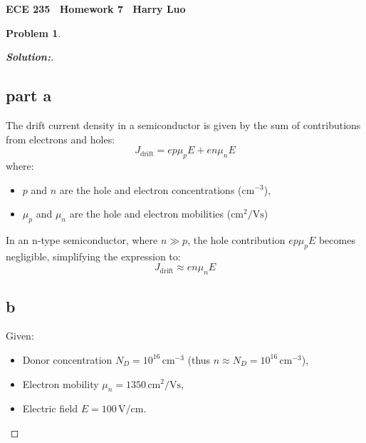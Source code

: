 \documentclass[12pt]{article}
\theoremstyle{definition}\newtheorem{problem}{Problem}
\newenvironment{solution}{\begin{proof}[\bfseries\textup{Solution:}]}{\end{proof}}
\begin{document}

\begin{center}
\bfseries ECE 235 %
\
Homework 7 %
\
Harry Luo %
\end{center}

\begin{problem}
\end{problem}
\begin{solution}
    \subsection*{part a}

    The drift current density in a semiconductor is given by the sum of contributions from electrons and holes:
    $$
    J_{\text{drift}} = e p \mu_p E + e n \mu_n E
    $$
    where:
    \begin{itemize}
        \item \( p \) and \( n \) are the hole and electron concentrations (\( \text{cm}^{-3} \)),
        \item \( \mu_p \) and \( \mu_n \) are the hole and electron mobilities (\( \text{cm}^2/\text{Vs} \))
    \end{itemize}
    In an n-type semiconductor, where \( n \gg p \), the hole contribution \( e p \mu_p E \) becomes negligible, simplifying the expression to:
    $$
    J_{\text{drift}} \approx e n \mu_n E
    $$
    
    \subsection*{b}
    
    Given:
    \begin{itemize}
        \item Donor concentration \( N_D = 10^{16} \, \text{cm}^{-3} \) (thus \( n \approx N_D = 10^{16} \, \text{cm}^{-3} \)),
        \item Electron mobility \( \mu_n = 1350 \, \text{cm}^2/\text{Vs} \),
        \item Electric field \( E = 100 \, \text{V/cm} \).
    \end{itemize}
    

\end{solution}
\end{document}
